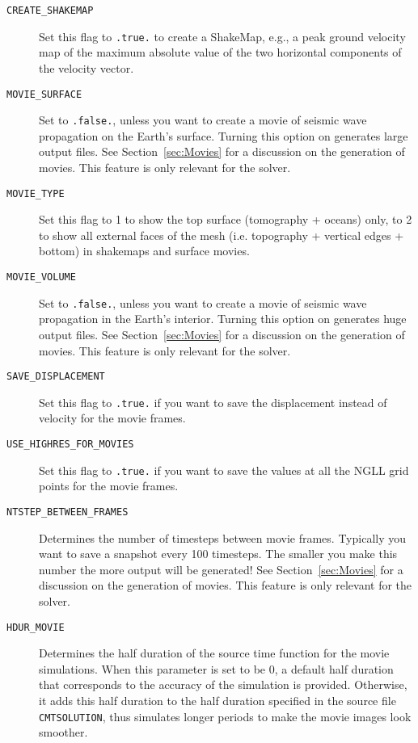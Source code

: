 \vspace{1cm}
\begin{description}
\item [{\texttt{CREATE\_SHAKEMAP}}] Set this flag to \texttt{.true.} to
create a ShakeMap\textregistered{}, e.g., a peak ground velocity map
of the maximum absolute value of the two horizontal components of
the velocity vector.
\item [{\texttt{MOVIE\_SURFACE}}] Set to \texttt{.false.}, unless you want
to create a movie of seismic wave propagation on the Earth's surface.
Turning this option on generates large output files. See Section~\ref{sec:Movies}
for a discussion on the generation of movies. This feature is only
relevant for the solver.
\item [{\texttt{MOVIE\_TYPE}}] Set this flag to 1 to show the top surface
(tomography + oceans) only, to 2 to show all external faces of the
mesh (i.e. topography + vertical edges + bottom) in shakemaps and
surface movies.
\item [{\texttt{MOVIE\_VOLUME}}] Set to \texttt{.false.}, unless you want
to create a movie of seismic wave propagation in the Earth's interior.
Turning this option on generates huge output files. See Section~\ref{sec:Movies}
for a discussion on the generation of movies. This feature is only
relevant for the solver.
\item [{\texttt{SAVE\_DISPLACEMENT}}] Set this flag to \texttt{.true.}
if you want to save the displacement instead of velocity for the movie
frames.
\item [{\texttt{USE\_HIGHRES\_FOR\_MOVIES}}] Set this flag to \texttt{.true.}
if you want to save the values at all the NGLL grid points for the
movie frames.
\item [{\texttt{NTSTEP\_BETWEEN\_FRAMES}}] Determines the number of timesteps
between movie frames. Typically you want to save a snapshot every
100 timesteps. The smaller you make this number the more output will
be generated! See Section~\ref{sec:Movies} for a discussion on the
generation of movies. This feature is only relevant for the solver.
\item [{\texttt{HDUR\_MOVIE}}] Determines the half duration of the source
time function for the movie simulations. When this parameter is set
to be 0, a default half duration that corresponds to the accuracy
of the simulation is provided. Otherwise, it adds this half duration
to the half duration specified in the source file \texttt{CMTSOLUTION},
thus simulates longer periods to make the movie images look smoother.

\end{description}
